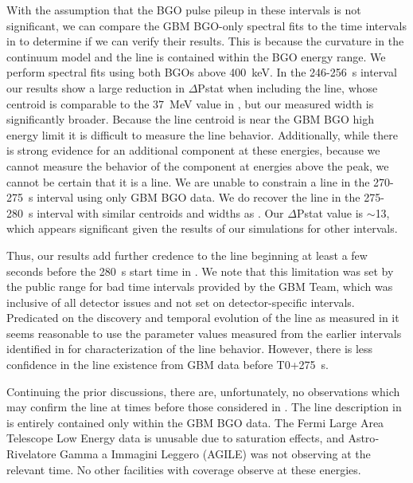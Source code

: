 \documentclass{aastex61}
\begin{document}
With the assumption that the BGO pulse pileup in these intervals is not significant, we can compare the GBM BGO-only spectral fits to the time intervals in \citet{zhang2024observation} to determine if we can verify their results. This is because the curvature in the continuum model and the line is contained within the BGO energy range. We perform spectral fits using both BGOs above 400~keV. In the 246-256~s interval our results show a large reduction in $\Delta$Pstat when including the line, whose centroid is comparable to the 37~MeV value in \citet{zhang2024observation}, but our measured width is significantly broader. Because the line centroid is near the GBM BGO high energy limit it is difficult to measure the line behavior. Additionally, while there is strong evidence for an additional component at these energies, because we cannot measure the behavior of the component at energies above the peak, we cannot be certain that it is a line. We are unable to constrain a line in the 270-275~s interval using only GBM BGO data. We do recover the line in the 275-280~s interval with similar centroids and widths as \citet{zhang2024observation}. Our $\Delta$Pstat value is $\sim$13, which appears significant given the results of our simulations for other intervals.

Thus, our results add further credence to the line beginning at least a few seconds before the 280~s start time in \citet{ravasio2024mega}. We note that this limitation was set by the public range for bad time intervals provided by the GBM Team, which was inclusive of all detector issues and not set on detector-specific intervals. Predicated on the discovery and temporal evolution of the line as measured in \citet{ravasio2024mega} it seems reasonable to use the parameter values measured from the earlier intervals identified in \citet{zhang2024observation} for characterization of the line behavior. However, there is less confidence in the line existence from GBM data before T0+275~s.

Continuing the prior discussions, there are, unfortunately, no observations which may confirm the line at times before those considered in \citet{ravasio2024mega}. The line description in \citet{zhang2024observation} is entirely contained only within the GBM BGO data. The Fermi Large Area Telescope Low Energy data is unusable due to saturation effects, and Astro‐Rivelatore Gamma a Immagini Leggero (AGILE) was not observing at the relevant time. No other facilities with coverage observe at these energies. 
\end{document}
